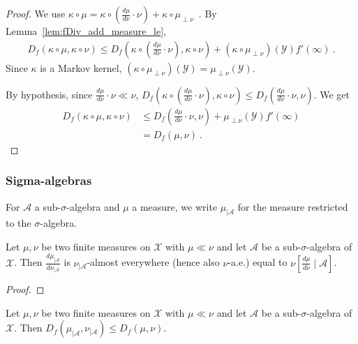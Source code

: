 \begin{proof}%
{}
We use $\kappa \circ \mu = \kappa \circ (\frac{d\mu}{d\nu}\cdot \nu) + \kappa \circ \mu_{\perp \nu}$~.
By Lemma~\ref{lem:fDiv_add_measure_le},
\begin{align*}
D_f(\kappa \circ \mu, \kappa \circ \nu)
\le D_f\left(\kappa \circ (\frac{d\mu}{d\nu}\cdot \nu), \kappa \circ \nu\right)
  + (\kappa \circ \mu_{\perp \nu})(\mathcal Y) f'(\infty)
\: .
\end{align*}
Since $\kappa$ is a Markov kernel, $(\kappa \circ \mu_{\perp \nu})(\mathcal Y) = \mu_{\perp \nu}(\mathcal Y)$.

By hypothesis, since $\frac{d\mu}{d\nu}\cdot \nu \ll \nu$, $D_f\left(\kappa \circ (\frac{d\mu}{d\nu}\cdot \nu), \kappa \circ \nu\right) \le D_f\left(\frac{d\mu}{d\nu}\cdot \nu, \nu\right)$.
We get
\begin{align*}
D_f(\kappa \circ \mu, \kappa \circ \nu)
&\le D_f\left(\frac{d\mu}{d\nu}\cdot \nu,\nu\right)
  + \mu_{\perp \nu}(\mathcal Y) f'(\infty)
\\
&= D_f(\mu, \nu)
\: .
\end{align*}
\end{proof}


\subsubsection{Sigma-algebras}

For $\mathcal A$ a sub-$\sigma$-algebra and $\mu$ a measure, we write $\mathcal \mu_{| \mathcal A}$ for the measure restricted to the $\sigma$-algebra.

\begin{lemma}
  \label{lem:rnDeriv_trim_of_ac}
  \leanok
  Let $\mu, \nu$ be two finite measures on $\mathcal X$ with $\mu \ll \nu$ and let $\mathcal A$ be a sub-$\sigma$-algebra of $\mathcal X$.
  Then $\frac{d \mu_{| \mathcal A}}{d \nu_{| \mathcal A}}$ is $\nu_{| \mathcal A}$-almost everywhere (hence also $\nu$-a.e.) equal to $\nu\left[ \frac{d \mu}{d \nu} \mid \mathcal A\right]$.
\end{lemma}

\begin{proof}\leanok
\end{proof}

\begin{lemma}
  \label{lem:fDiv_trim_le_of_ac}
  \leanok
  Let $\mu, \nu$ be two finite measures on $\mathcal X$ with $\mu \ll \nu$ and let $\mathcal A$ be a sub-$\sigma$-algebra of $\mathcal X$. Then
  $D_f(\mu_{| \mathcal A}, \nu_{| \mathcal A}) \le D_f(\mu, \nu)$.
\end{lemma}

